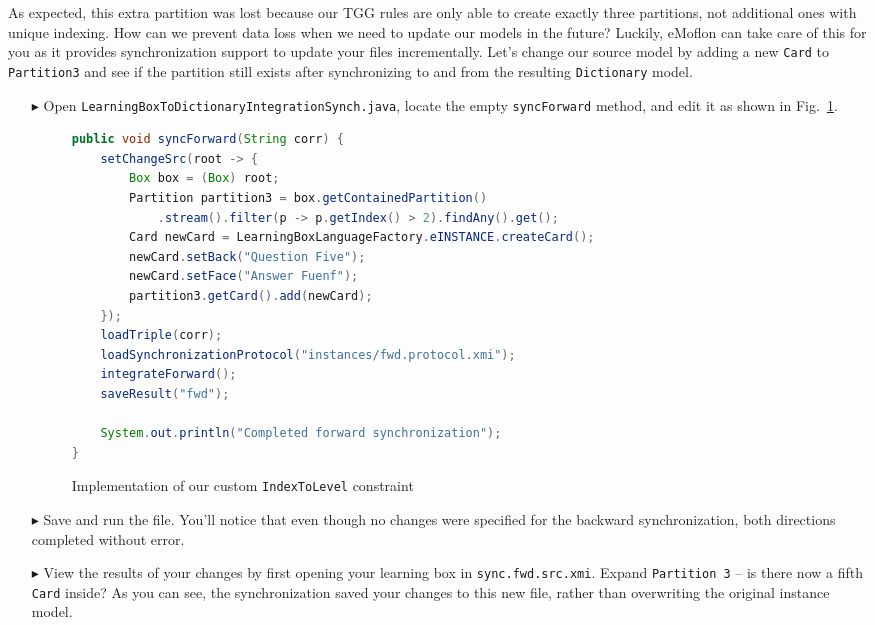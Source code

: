 As expected, this extra partition was lost because our TGG rules are only able to create exactly three partitions, not additional ones with unique indexing.
How can we prevent data loss when we need to update our models in the future? Luckily, eMoflon can take care of this for you as it provides synchronization
support to update your files incrementally. Let's change our source model by adding a new \texttt{Card} to \texttt{Partition3} and see if the partition still
exists after synchronizing to and from the resulting \texttt{Dictionary} model.

\begin{itemize}

\item[$\blacktriangleright$] Open \texttt{LearningBoxToDictionaryIntegrationSynch.java}, locate the empty \texttt{syncForward} method, and edit it as
shown in Fig.~\ref{eclipse:synchForward}.

\begin{figure}[htbp]
\begin{center}
\begin{lstlisting}[language=Java,backgroundcolor=\color{white}, keywordstyle={\bfseries\color{purple}}]
public void syncForward(String corr) {
	setChangeSrc(root -> { 
		Box box = (Box) root;
		Partition partition3 = box.getContainedPartition()
			.stream().filter(p -> p.getIndex() > 2).findAny().get();
		Card newCard = LearningBoxLanguageFactory.eINSTANCE.createCard();
		newCard.setBack("Question Five");
		newCard.setFace("Answer Fuenf");
		partition3.getCard().add(newCard);
	});
	loadTriple(corr);
	loadSynchronizationProtocol("instances/fwd.protocol.xmi");
	integrateForward();
	saveResult("fwd");
	
	System.out.println("Completed forward synchronization");
}
\end{lstlisting}
  \caption{Implementation of our custom \texttt{IndexToLevel} constraint}
  \label{eclipse:synchForward}
\end{center}
\end{figure}


\item[$\blacktriangleright$] Save and run the file. You'll notice that even though no changes were specified for the backward synchronization, both directions
completed without error.

\item[$\blacktriangleright$] View the results of your changes by first opening your learning box in \texttt{sync.fwd.src.xmi}. Expand \texttt{Partition 3} --
is there now a fifth \texttt{Card} inside? As you can see, the synchronization saved your changes to this new file, rather than overwriting the original
instance model.


\end{itemize}
